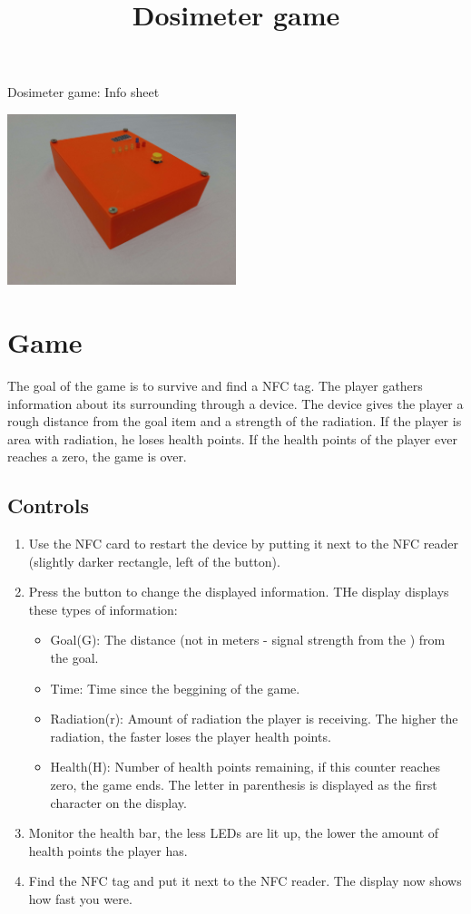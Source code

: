 \documentclass{article}
\title{Dosimeter game}
\begin{document}
{\huge{Dosimeter game: Info sheet}}

\begin{center}
    \centering
    \includegraphics[width=0.5\textwidth]{imgs/Box2.jpg}
\end{center}

\section{Game}
The goal of the game is to survive and find a NFC tag. 
The player gathers information about its surrounding through a device.
The device gives the player a rough distance from the goal item and a strength of the radiation.
If the player is area with radiation, he loses health points.
If the health points of the player ever reaches a zero, the game is over.

\subsection{Controls}
\begin{enumerate}
\item Use the NFC card to restart the device by putting it next to the NFC reader (slightly darker rectangle, left of the button).
\item Press the button to change the displayed information. THe display displays these types of information:
\begin{itemize}
\item Goal(G): The distance (not in meters - signal strength from the ) from the goal.
\item Time: Time since the beggining of the game.
\item Radiation(r): Amount of radiation the player is receiving. The higher the radiation, the faster loses the player health points. 
\item Health(H): Number of health points remaining, if this counter reaches zero, the game ends.
The letter in parenthesis is displayed as the first character on the display.
\end{itemize}
\item Monitor the health bar, the less LEDs are lit up, the lower the amount of health points the player has.
\item Find the NFC tag and put it next to the NFC reader. The display now shows how fast you were.
\end{enumerate}
\end{document}
